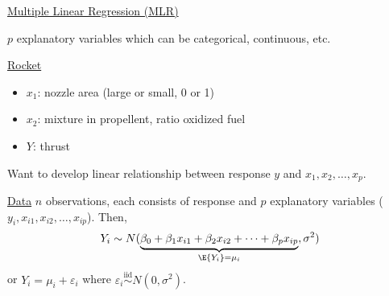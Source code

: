 \underline{Multiple Linear Regression (MLR)}

$ p $ explanatory variables which can be categorical,
continuous, etc.

\underline{Rocket}
\begin{itemize}
    \item $ x_1 $: nozzle area (large or small, 0 or 1)
    \item $ x_2 $: mixture in propellent, ratio oxidized fuel
    \item $ Y $: thrust
\end{itemize}
Want to develop linear relationship between response $ y $
and $ x_1,x_2,\ldots,x_p $.

\underline{Data}
$ n $ observations, each consists of
response and $ p $ explanatory variables ($ y_i , x_{i1},x_{i2},\ldots,x_{ip} $).
Then,
\[ Y_i \sim N(
    \underbrace{\beta_0+\beta_1x_{i1}+
        \beta_2x_{i2}+\cdots +\beta_p x_{ip}}_{\E{Y_i}=
        \mu_i},\sigma^2) \]
or $ Y_i=\mu_i+\varepsilon_i $ where $ \varepsilon_i \stackrel{\text{iid}}{\sim}
    N(0,\sigma^2) $.

